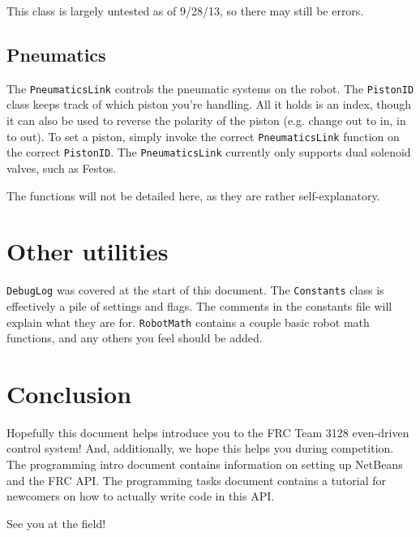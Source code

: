 \documentclass[a4paper]{article}
\begin{document}
This class is largely untested as of 9/28/13, so there may still be errors.

\subsection{Pneumatics}

The \lstinline{PneumaticsLink} controls the pneumatic systems on the robot. The \lstinline{PistonID} class keeps track of which piston you're handling. All it holds is an index, though it can also be used to reverse the polarity of the piston (e.g. change out to in, in to out). To set a piston, simply invoke the correct \lstinline{PneumaticsLink} function on the correct \lstinline{PistonID}. The \lstinline{PneumaticsLink} currently only supports dual solenoid valves, such as Festos.

The functions will not be detailed here, as they are rather self-explanatory.


\section{Other utilities}

\lstinline{DebugLog} was covered at the start of this document. The \lstinline{Constants} class is effectively a pile of settings and flags. The comments in the constants file will explain what they are for. \lstinline{RobotMath} contains a couple basic robot math functions, and any others you feel should be added.

\section{Conclusion}

Hopefully this document helps introduce you to the FRC Team 3128 even-driven control system! And, additionally, we hope this helps you during competition. The programming intro document contains information on setting up NetBeans and the FRC API. The programming tasks document contains a tutorial for newcomers on how to actually write code in this API.

See you at the field!
\end{document}
